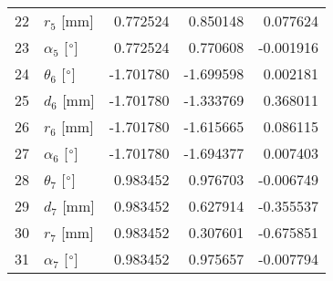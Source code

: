\documentclass{standalone}%
\begin{document}
\begin{tabular}{llrrr}
22 &              $r_{5}$ [mm] &  0.772524 &   0.850148 &   0.077624 \\
23 &  $\alpha_{5}$ [$\degree$] &  0.772524 &   0.770608 &  -0.001916 \\
24 &  $\theta_{6}$ [$\degree$] & -1.701780 &  -1.699598 &   0.002181 \\
25 &              $d_{6}$ [mm] & -1.701780 &  -1.333769 &   0.368011 \\
26 &              $r_{6}$ [mm] & -1.701780 &  -1.615665 &   0.086115 \\
27 &  $\alpha_{6}$ [$\degree$] & -1.701780 &  -1.694377 &   0.007403 \\
28 &  $\theta_{7}$ [$\degree$] &  0.983452 &   0.976703 &  -0.006749 \\
29 &              $d_{7}$ [mm] &  0.983452 &   0.627914 &  -0.355537 \\
30 &              $r_{7}$ [mm] &  0.983452 &   0.307601 &  -0.675851 \\
31 &  $\alpha_{7}$ [$\degree$] &  0.983452 &   0.975657 &  -0.007794 \\
\bottomrule
\end{tabular}
%
\end{document}
